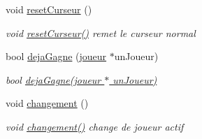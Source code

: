 \begin{DoxyCompactItemize}
void \hyperlink{class_main_window_a3ab75adb0221eb5e362f2070f71ebc22}{reset\-Curseur} ()
\begin{DoxyCompactList}\small\item\em void \hyperlink{class_main_window_a3ab75adb0221eb5e362f2070f71ebc22}{reset\-Curseur()}  remet le curseur normal \end{DoxyCompactList}\item 
bool \hyperlink{class_main_window_a1810f8a7d5a8497d738d909efca8947b}{deja\-Gagne} (\hyperlink{classjoueur}{joueur} $\ast$un\-Joueur)
\begin{DoxyCompactList}\small\item\em bool \hyperlink{class_main_window_a1810f8a7d5a8497d738d909efca8947b}{deja\-Gagne(joueur $\ast$ un\-Joueur)} \end{DoxyCompactList}\item 
void \hyperlink{class_main_window_a3c0bedf7eae76f0c5ca35bd16491b919}{changement} ()
\begin{DoxyCompactList}\small\item\em void \hyperlink{class_main_window_a3c0bedf7eae76f0c5ca35bd16491b919}{changement()}  change de joueur actif \end{DoxyCompactList}\end{DoxyCompactItemize}
